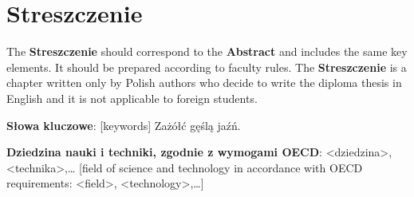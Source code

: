 \chapter*{Streszczenie}

The \textbf{Streszczenie} should correspond to the \textbf{Abstract} and includes the same key elements. It  should be prepared according to faculty rules. The \textbf{Streszczenie} is a chapter written only by Polish authors who decide to write the diploma thesis in English and it is not applicable to foreign students. 

\vspace{12pt}
\noindent\textbf{Słowa kluczowe}: [keywords] Zażółć gęślą jaźń.

\vspace{12pt}
\noindent\textbf{Dziedzina nauki i techniki, zgodnie z wymogami OECD}: \textless{}dziedzina\textgreater{}, \textless{}technika\textgreater{},\ldots
[field of science and technology in accordance with OECD requirements: \textless{}field\textgreater{}, \textless{}technology\textgreater{},\ldots]